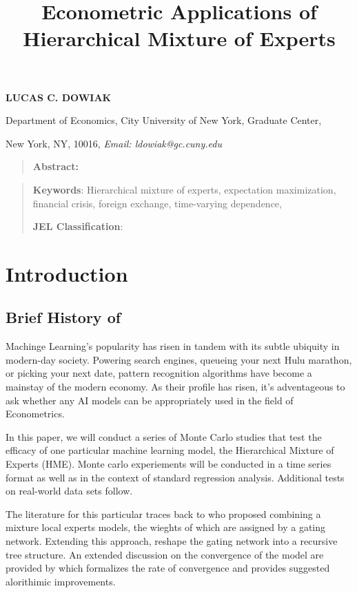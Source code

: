\documentclass[12pt]{article}
\title{Econometric Applications of Hierarchical Mixture of Experts}
\begin{document}
 
\maketitle{}


\textbf{LUCAS C. DOWIAK\medskip}

Department of Economics, City University of New York\smallskip, Graduate
Center,

New York, NY, 10016, \textit{Email: ldowiak@gc.cuny.edu}

\qquad

\begin{quotation}
\textbf{Abstract:}
\end{quotation}

\vspace{1pt}

\begin{quotation}
\textbf{Keywords}: Hierarchical mixture of experts, expectation maximization, financial crisis, foreign exchange, time-varying dependence,

\textbf{JEL Classification}: 
\end{quotation}

\vspace{1pt}

\section{Introduction}

\subsection{Brief History of }
Machinge Learning's popularity has risen in tandem with its subtle ubiquity in modern-day society. Powering search engines, queueing your next Hulu marathon, or picking your next date, pattern recognition algorithms have become a mainstay of the modern economy. As their profile has risen, it's adventageous to ask whether any AI models can be appropriately used in the field of Econometrics.

In this paper, we will conduct a series of Monte Carlo studies that test the efficacy of one particular machine learning model, the Hierarchical Mixture of Experts (HME). Monte carlo experiements will be conducted in a time series format as well as in the context of standard regression analysis. Additional tests on real-world data sets follow.

The literature for this particular traces back to \cite{JJNH} who proposed combining a mixture local experts models, the wieghts of which are assigned by a gating network. Extending this approach, \cite{JordanJacobsHME} reshape the gating network into a recursive tree structure. An extended discussion on the convergence of the model are provided by \cite{JordanXuConverg} which formalizes the rate of convergence and provides suggested alorithimic improvements.
\end{document}
